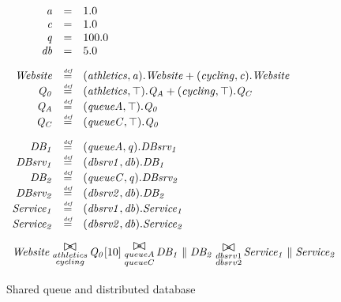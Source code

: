 \begin{figure}
	\centering
	\begin{displaymath}
	\begin{array}{rcl}
	\mathit{a} & = & 1.0\\
	\mathit{c} & = & 1.0\\
	\mathit{q} & = & 100.0\\
	\mathit{db} & = & 5.0\\
	[2.0ex]		\mathit{Website} & \rmdef & (\mathit{athletics},\mathit{a}).\mathit{Website}+(\mathit{cycling},\mathit{c}).\mathit{Website}\\
	\mathit{Q_0} & \rmdef & (\mathit{athletics},\top).\mathit{Q_A}+(\mathit{cycling},\top).\mathit{Q_C}\\
	\mathit{Q_A} & \rmdef & (\mathit{queueA},\top).\mathit{Q_0}\\
	\mathit{Q_C} & \rmdef & (\mathit{queueC},\top).\mathit{Q_0}\\
	[2.0ex]		\mathit{DB_1} & \rmdef & (\mathit{queueA},\mathit{q}).\mathit{DBsrv_1}\\
	\mathit{DBsrv_1} & \rmdef & (\mathit{dbsrv1},\mathit{db}).\mathit{DB_1}\\
	\mathit{DB_2} & \rmdef & (\mathit{queueC},\mathit{q}).\mathit{DBsrv_2}\\
	\mathit{DBsrv_2} & \rmdef & (\mathit{dbsrv2},\mathit{db}).\mathit{DB_2}\\
	\mathit{Service_1} & \rmdef & (\mathit{dbsrv1},\mathit{db}).\mathit{Service_1}\\
	\mathit{Service_2} & \rmdef & (\mathit{dbsrv2},\mathit{db}).\mathit{Service_2}\\
	[2.0ex]		\multicolumn{3}{l}{\mathit{Website}\sync{\substack{athletics\\cycling}}\mathit{Q_0}[10]\sync{\substack{queueA\\queueC}}\mathit{DB_1}\parallel\mathit{DB_2}\sync{\substack{dbsrv1\\dbsrv2}}\mathit{Service_1}\parallel\mathit{Service_2}}\\
	[2.0ex]	\end{array}
	\end{displaymath}
	\caption{Shared queue and distributed database}
	\label{figure:queuedd}
\end{figure}

